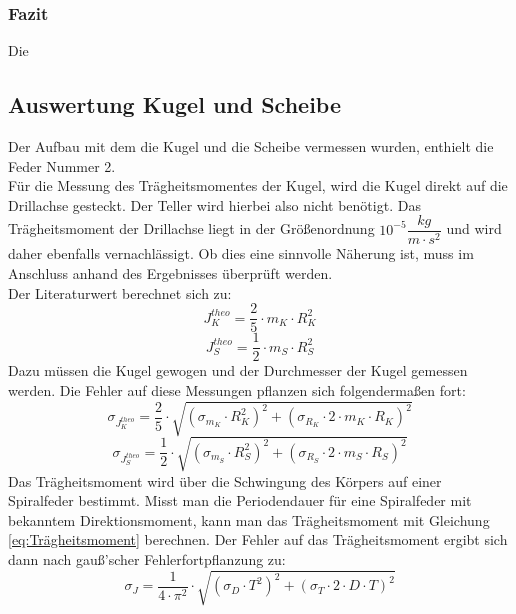 \documentclass[12pt,a4paper]{article}
\begin{document}
\subsubsection{Fazit}
Die 

\subsection{Auswertung Kugel und Scheibe}
Der Aufbau mit dem die Kugel und die Scheibe vermessen wurden, enthielt die Feder Nummer 2. \\
Für die Messung des Trägheitsmomentes der Kugel, wird die Kugel direkt auf die Drillachse gesteckt. Der Teller wird hierbei also nicht benötigt. Das Trägheitsmoment der Drillachse liegt in der Größenordnung $10^{-5} \dfrac{kg}{m \cdot s^2}$ und wird daher ebenfalls vernachlässigt. Ob dies eine sinnvolle Näherung ist, muss im Anschluss anhand des Ergebnisses überprüft werden. \\
Der Literaturwert berechnet sich zu:
\begin{equation}
J_K^{theo} = \dfrac{2}{5} \cdot m_K \cdot R_K^2
\label{eq:JKtheo}
\end{equation}
\begin{equation}
J_S^{theo} = \dfrac{1}{2} \cdot m_S \cdot R_S^2
\label{eq:JStheo}
\end{equation}
Dazu müssen die Kugel gewogen und der Durchmesser der Kugel gemessen werden. Die Fehler auf diese Messungen pflanzen sich folgendermaßen fort:
\begin{equation}
\sigma_{J_K^{theo}} = \dfrac{2}{5} \cdot \sqrt{\left( \sigma_{m_K} \cdot R_K^2 \right)^2 + \left( \sigma_{R_K} \cdot 2 \cdot m_K \cdot R_K \right)^2}
\label{eq:sigJKtheo}
\end{equation}
\begin{equation}
\sigma_{J_S^{theo}} = \dfrac{1}{2} \cdot \sqrt{\left( \sigma_{m_S} \cdot R_S^2 \right)^2 + \left( \sigma_{R_S} \cdot 2 \cdot m_S \cdot R_S \right)^2}
\label{eq:sigJKtheo}
\end{equation}
Das Trägheitsmoment wird über die Schwingung des Körpers auf einer Spiralfeder bestimmt. Misst man die Periodendauer für eine Spiralfeder mit bekanntem Direktionsmoment, kann man das Trägheitsmoment mit Gleichung \ref{eq:Trägheitsmoment} berechnen. Der Fehler auf das Trägheitsmoment ergibt sich dann nach gauß'scher Fehlerfortpflanzung zu:
\begin{equation}
\sigma_J = \dfrac{1}{4 \cdot \pi^2} \cdot \sqrt{ \left( \sigma_D \cdot T^2 \right)^2 + \left( \sigma_T \cdot 2 \cdot D \cdot T \right)^2}
\label{eq:sigTrägheitsmoment}
\end{equation}
\end{document}
